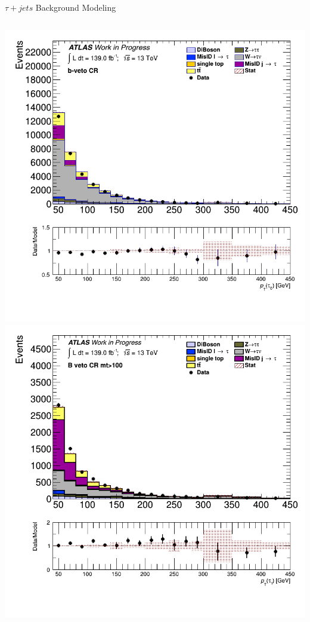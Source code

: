 \documentclass[aspectratio=169,xcolor=table]{beamer}
\begin{document}
\begin{frame}[t]{$\tau+jets$ Background Modeling}
\begin{columns}[t]
          \includegraphics[height=.45\textheight,keepaspectratio=true]{taujet_1p_3p/v09/tau_0_pt_BVETO.png}
          \includegraphics[height=.45\textheight,keepaspectratio=true]{taujet_1p_3p/v09/tau_0_pt_bveto100.png}



\end{columns}
\end{frame}
\end{document}
